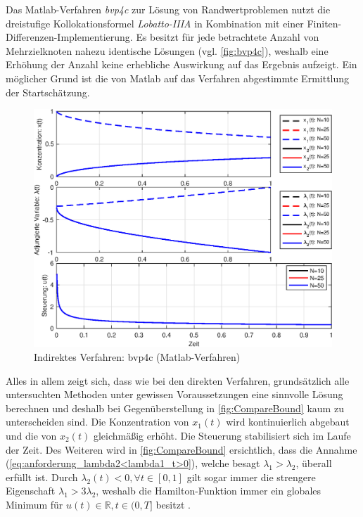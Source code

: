 Das Matlab-Verfahren \textit{bvp4c} zur Lösung von Randwertproblemen nutzt die dreistufige Kollokationsformel \textit{Lobatto-IIIA} in Kombination mit einer Finiten-Differenzen-Implementierung.  \cite{bvp4c} Es besitzt für jede betrachtete Anzahl von Mehrzielknoten nahezu identische Lösungen (vgl. \autoref{fig:bvp4c}), weshalb eine Erhöhung der Anzahl keine erhebliche Auswirkung auf das Ergebnis aufzeigt. Ein möglicher Grund ist die von Matlab auf das Verfahren abgestimmte Ermittlung der Startschätzung.

\begin{figure}[h!]
	\centering
	\includegraphics[width=.85\textwidth]{images/Matlab_bvp4c_Result}
	\caption{Indirektes Verfahren: bvp4c (Matlab-Verfahren)}
	\label{fig:bvp4c}
\end{figure}
\pagebreak
Alles in allem zeigt sich, dass wie bei den direkten Verfahren, grundsätzlich alle untersuchten Methoden unter gewissen Voraussetzungen eine sinnvolle Lösung berechnen und deshalb bei Gegenüberstellung in \autoref{fig:CompareBound} kaum zu unterscheiden sind. Die Konzentration von $x_1(t)$ wird kontinuierlich abgebaut und die von $x_2(t)$ gleichmäßig erhöht. Die Steuerung stabilisiert sich im Laufe der Zeit. Des Weiteren wird in \autoref{fig:CompareBound} ersichtlich, dass die Annahme (\ref{eq:anforderung_lambda2<lambda1_t>0}), welche besagt  $\lambda_1 > \lambda_2$, überall erfüllt ist. Durch $\lambda_2(t) < 0, \forall t \in [0,1]$ gilt sogar immer die strengere Eigenschaft $\lambda_1 > 3\lambda_2$, weshalb die Hamilton-Funktion immer ein globales Minimum für $u(t) \in \mathbb{R}, t \in (0,T]$ besitzt .

